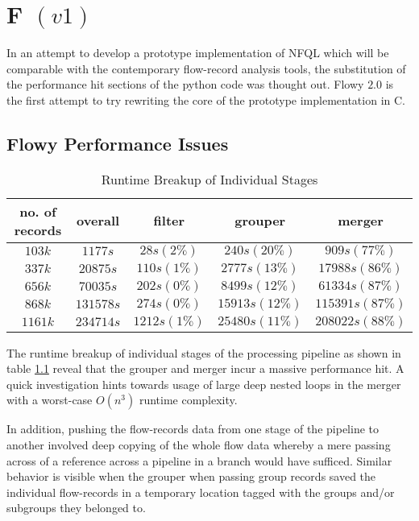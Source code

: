 \chapter{F $(v1)$}\label{ch:flowy-2}

In an attempt to develop a prototype implementation of \ac{NFQL} which will be
comparable with the contemporary flow-record analysis tools, the substitution
of the performance hit sections of the python code was thought out. Flowy
$2.0$ \cite{jschauer:thesis:2011} is the first attempt to try rewriting the
core of the prototype implementation in C.

\section{Flowy Performance Issues}\label{sec:performance-issues}

\begin{table}[h!]
	\begin{tabular}{|c|c|c|c|c|}
	\hline
	no. of records & overall & filter & grouper & merger \\
	\hline
	\hline
	$103k$ & $1177s$ & $28s (2\%)$ & $240s (20\%)$ & $909s (77\%)$\\
	\hline
	$337k$ & $20875s$ & $110s (1\%)$ & $2777s (13\%)$ & $17988s (86\%)$\\
	\hline
	$656k$ & $70035s$ & $202s (0\%)$ & $8499s (12\%)$ & $61334s (87\%)$\\
	\hline
	$868k$ & $131578s$ & $274s (0\%)$ & $15913s (12\%)$ & $115391s (87\%)$\\
	\hline
	$1161k$ & $234714s$ & $1212s (1\%)$ & $25480s (11\%)$ & $208022s (88\%)$\\
	\hline
	\end{tabular}
\caption{Runtime Breakup of Individual Stages \cite{jschauer:thesis:2011}}
\label{tab:flowy2-profiling}
\end{table}

The runtime breakup of individual stages of the processing pipeline as shown
in table \ref{tab:flowy2-profiling} reveal that the grouper and merger incur a
massive performance hit. A quick  investigation
hints towards usage of large deep nested loops in the merger with a worst-case
$O(n^3)$ runtime complexity.

In addition, pushing the flow-records data from one stage of the pipeline to
another involved deep copying of the whole flow data whereby a mere passing
across of a  reference across a pipeline
in a branch would have sufficed. Similar behavior is visible when the grouper
when passing group records saved the individual flow-records in a temporary
location tagged with the groups and/or subgroups they belonged to.

